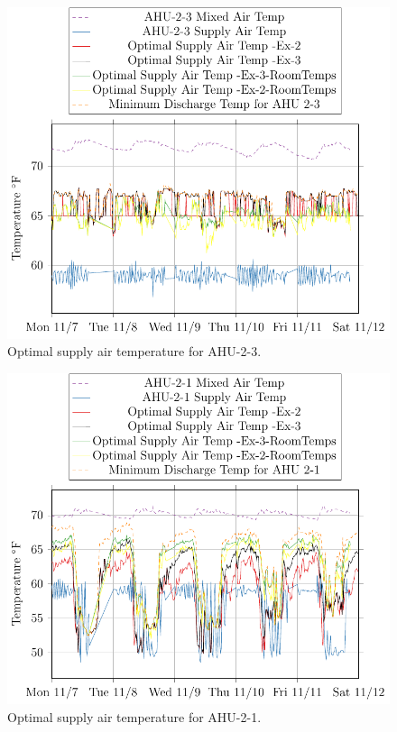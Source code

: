 \begin{figure}
\centering
\includegraphics[]{Plots/2016-11-30-1004-AHU23MixedAirTemp-TikzData.pdf}
\caption{Optimal supply air temperature for AHU-2-3.}
\label{fig:2016-11-30-1004-AHU23MixedAirTemp-TikzData}
\end{figure}

\begin{figure}
\centering
\includegraphics[]{Plots/2016-11-30-0943-AHU21MixedAirTemp-TikzData.pdf}
\caption{Optimal supply air temperature for AHU-2-1.}
\label{fig:2016-11-30-0943-AHU21MixedAirTemp-TikzData}
\end{figure}

